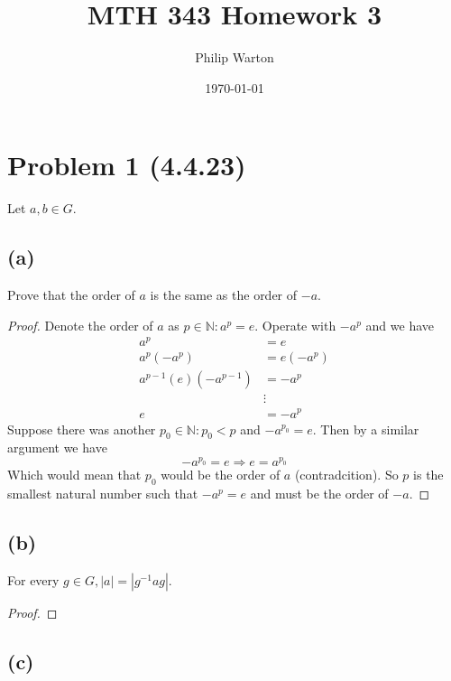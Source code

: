 \documentclass{article}
\begin{document}
\title{MTH 343 Homework 3}
\author{Philip Warton}
\date{\today}
\maketitle

\section*{Problem 1 (4.4.23)}
Let $a,b \in G$.
\subsection*{(a)}
Prove that the order of $a$ is the same as the order of $-a$.
\begin{proof}
    Denote the order of $a$ as $p \in \mathbb{N} : a^p = e$.
    Operate with $-a^p$ and we have 
    \begin{align*}
        a^p & = e \\
        a^p (-a^p) & = e (-a^p) \\
        a^{p-1}(e)(-a^{p-1}) & = -a^p \\
        & \vdots \\
        e & = -a^p
    \end{align*}
    Suppose there was another $p_0 \in \mathbb{N} : p_0 < p$ and $-a^{p_0} = e$.
    Then by a similar argument we have 
    \[
        -a^{p_0} = e \Rightarrow e = a^{p_0}
    \]
    Which would mean that $p_0$ would be the order of $a$ (contradcition).
    So $p$ is the smallest natural number such that $-a^p = e$ and must be the order of $-a$.
\end{proof}
\subsection*{(b)}
For every $g \in G, |a| = |g^{-1}ag|$.
\begin{proof}
    
\end{proof}
\subsection*{(c)}
\end{document}
